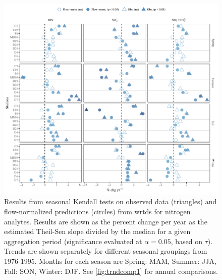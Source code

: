 \documentclass[journal = esthag, manuscript = article]{achemso}\usepackage[]{graphicx}\usepackage[]{color}
\newcommand{\beginsupplement}{%
        \setcounter{table}{0}
        \renewcommand{\thetable}{S\arabic{table}}%
        \setcounter{figure}{0}
        \renewcommand{\thefigure}{S\arabic{figure}}%
     }
\begin{document}
\clearpage

\begin{suppinfo}
\beginsupplement

\begin{figure}
\centering
\includegraphics[width=1\textwidth,page=1]{figs/trndcomp2.pdf}
\caption{Results from seasonal Kendall tests on observed data (triangles) and flow-normalized predictions (circles) from \ac{wrtds} for nitrogen analytes. Results are shown as the percent change per year as the estimated Theil-Sen slope divided by the median for a given aggregation period (significance evaluated at $\alpha = 0.05$, based on $\tau$). Trends are shown separately for different seasonal groupings from 1976-1995. Months for each season are Spring: MAM, Summer: JJA, Fall: SON, Winter: DJF. See \cref{fig:trndcomp1} for annual comparisons.}
\label{fig:trndcomp2}   
\end{figure}


\end{suppinfo}
\end{document}
